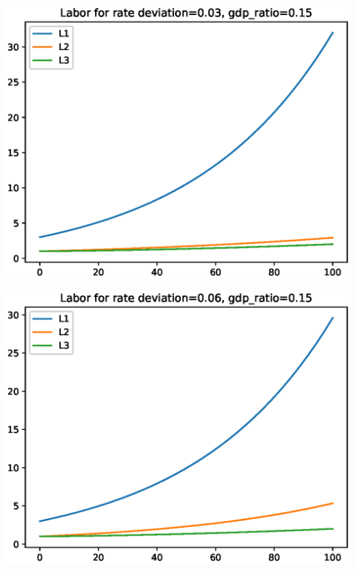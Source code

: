 \documentclass[12pt]{article}
\theoremstyle{definition}
\begin{document}
\begin{minipage}{\linewidth}
\begin{framed}
\begin{minipage}[t]{.48\textwidth}
\centering
\includegraphics[width=1\textwidth]{images/econ_0_run_0_labor}
\end{minipage}\hfill
\begin{minipage}[t]{.48\textwidth}
\centering
\includegraphics[width=1\textwidth]{images/econ_0_run_1_labor}
\end{minipage}\hfill
\begin{minipage}[t]{.48\textwidth}
\centering

\end{minipage}
\end{framed}
\end{minipage}
\end{document}
